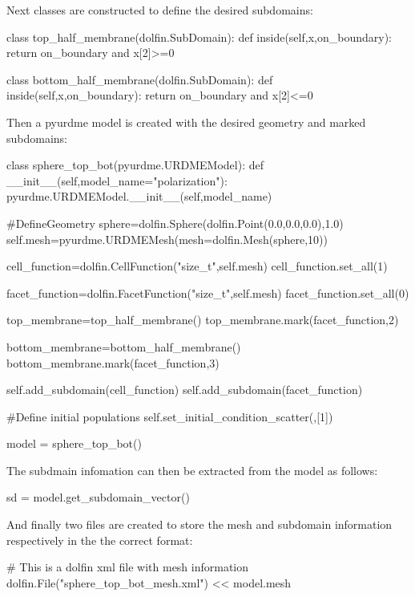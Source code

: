 Next classes are constructed to define the desired subdomains:

\begin{ipythonnb}
class top_half_membrane(dolfin.SubDomain):
	def inside(self,x,on_boundary):
	return on_boundary and x[2]>=0
	
class bottom_half_membrane(dolfin.SubDomain):
	def inside(self,x,on_boundary):
	return on_boundary and x[2]<=0
\end{ipythonnb}

Then a pyurdme model is created with the desired geometry and marked subdomains:

\begin{ipythonnb}
class sphere_top_bot(pyurdme.URDMEModel):
	def __init__(self,model_name="polarization"):
		pyurdme.URDMEModel.__init__(self,model_name)
		
		#DefineGeometry
		sphere=dolfin.Sphere(dolfin.Point(0.0,0.0,0.0),1.0)
		self.mesh=pyurdme.URDMEMesh(mesh=dolfin.Mesh(sphere,10))

		cell_function=dolfin.CellFunction("size_t",self.mesh)
		cell_function.set_all(1)

		facet_function=dolfin.FacetFunction("size_t",self.mesh)
		facet_function.set_all(0)

		top_membrane=top_half_membrane()
		top_membrane.mark(facet_function,2)

		bottom_membrane=bottom_half_membrane()
		bottom_membrane.mark(facet_function,3)

		self.add_subdomain(cell_function)
		self.add_subdomain(facet_function)

		#Define initial populations
		self.set_initial_condition_scatter({},[1])
\end{ipythonnb}

\begin{ipythonnb}
model = sphere_top_bot()
\end{ipythonnb}

The subdmain infomation can then be extracted from the model as follows:
\begin{ipythonnb}
sd = model.get_subdomain_vector()
\end{ipythonnb}

And finally two files are created to store the mesh and subdomain information respectively in the the correct format:
\begin{ipythonnb}
\# This is a dolfin xml file with mesh information
dolfin.File("sphere_top_bot_mesh.xml") << model.mesh
\end{ipythonnb}


